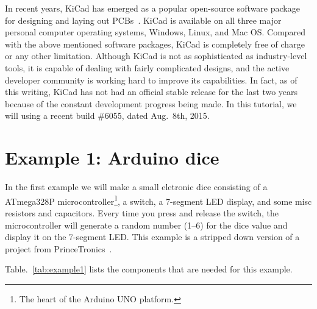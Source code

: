 \documentclass[12pt,letterpaper]{scrartcl}
\begin{document}
In recent years, KiCad has emerged as a popular open-source software package for designing and laying out PCBs~\cite{kicad}. KiCad is available on all three major personal computer operating systems, Windows, Linux, and Mac OS. 
Compared with the above mentioned software packages, KiCad is completely free of charge or any other limitation. Although KiCad is not as sophisticated as industry-level tools, it is capable of dealing with fairly complicated designs, and the active developer community is working hard to improve its capabilities. In fact, as of this writing, KiCad has not had an official stable release for the last two years because of the constant development progress being made. In this tutorial, we will using a recent build \#6055, dated Aug.~8th, 2015.

\newpage
\section{Example 1: Arduino dice}
In the first example we will make a small eletronic dice consisting of a ATmega328P microcontroller\footnote{The heart of the Arduino UNO platform.}, a switch, a 7-segment LED display, and some misc resistors and capacitors. Every time you press and release the switch, the microcontroller will generate a random number (1--6) for the dice value and display it on the 7-segment LED. This example is a stripped down version of a project from PrinceTronics~\cite{dice}. 

Table.~\ref{tab:example1} lists the components that are needed for this example.
\end{document}
